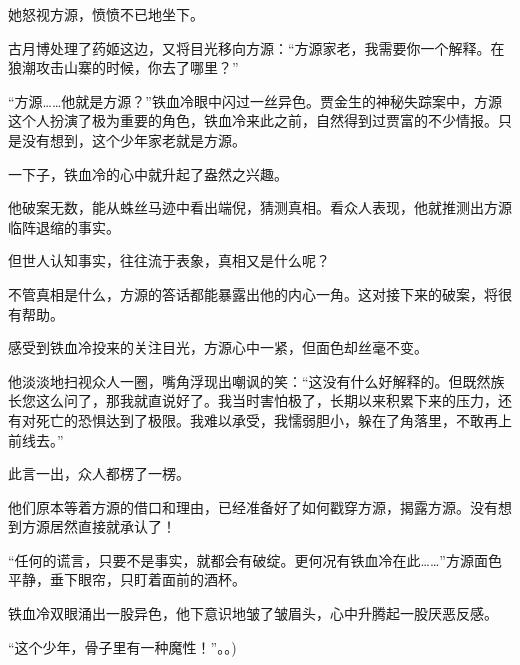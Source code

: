 \begin{this_body}
她怒视方源，愤愤不已地坐下。

古月博处理了药姬这边，又将目光移向方源：“方源家老，我需要你一个解释。在狼潮攻击山寨的时候，你去了哪里？”

“方源……他就是方源？”铁血冷眼中闪过一丝异色。贾金生的神秘失踪案中，方源这个人扮演了极为重要的角色，铁血冷来此之前，自然得到过贾富的不少情报。只是没有想到，这个少年家老就是方源。

一下子，铁血冷的心中就升起了盎然之兴趣。

他破案无数，能从蛛丝马迹中看出端倪，猜测真相。看众人表现，他就推测出方源临阵退缩的事实。

但世人认知事实，往往流于表象，真相又是什么呢？

不管真相是什么，方源的答话都能暴露出他的内心一角。这对接下来的破案，将很有帮助。

感受到铁血冷投来的关注目光，方源心中一紧，但面色却丝毫不变。

他淡淡地扫视众人一圈，嘴角浮现出嘲讽的笑：“这没有什么好解释的。但既然族长您这么问了，那我就直说好了。我当时害怕极了，长期以来积累下来的压力，还有对死亡的恐惧达到了极限。我难以承受，我懦弱胆小，躲在了角落里，不敢再上前线去。”

此言一出，众人都楞了一楞。

他们原本等着方源的借口和理由，已经准备好了如何戳穿方源，揭露方源。没有想到方源居然直接就承认了！

“任何的谎言，只要不是事实，就都会有破绽。更何况有铁血冷在此……”方源面色平静，垂下眼帘，只盯着面前的酒杯。

铁血冷双眼涌出一股异色，他下意识地皱了皱眉头，心中升腾起一股厌恶反感。

“这个少年，骨子里有一种魔性！”。。)

\end{this_body}

